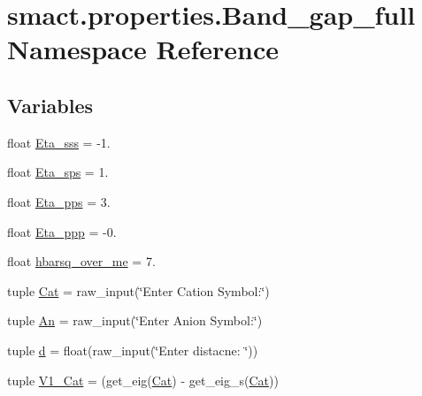 \hypertarget{namespacesmact_1_1properties_1_1_band__gap__full}{}\section{smact.\+properties.\+Band\+\_\+gap\+\_\+full Namespace Reference}
\label{namespacesmact_1_1properties_1_1_band__gap__full}
\subsection*{Variables}
\begin{DoxyCompactItemize}
\item 
float \hyperlink{namespacesmact_1_1properties_1_1_band__gap__full_a33c6d472118643d5753097ba13eb8c63}{Eta\+\_\+sss} = -\/1.
\item 
float \hyperlink{namespacesmact_1_1properties_1_1_band__gap__full_afec9c51df8f8ae4228ad90d10097981b}{Eta\+\_\+sps} = 1.
\item 
float \hyperlink{namespacesmact_1_1properties_1_1_band__gap__full_acd2104fa7868561e3f2e824c96dff9db}{Eta\+\_\+pps} = 3.
\item 
float \hyperlink{namespacesmact_1_1properties_1_1_band__gap__full_ad8248e3b75f41c62bc132eaf7fd7a332}{Eta\+\_\+ppp} = -\/0.
\item 
float \hyperlink{namespacesmact_1_1properties_1_1_band__gap__full_a4db80d70c7da3674fe2e949c069e41bb}{hbarsq\+\_\+over\+\_\+me} = 7.
\item 
tuple \hyperlink{namespacesmact_1_1properties_1_1_band__gap__full_a07754657208eba604cfe8ee09d738332}{Cat} = raw\+\_\+input(\char`\"{}Enter Cation Symbol\+:\char`\"{})
\item 
tuple \hyperlink{namespacesmact_1_1properties_1_1_band__gap__full_acc697d191f70ba02803a3906c6ec6844}{An} = raw\+\_\+input(\char`\"{}Enter Anion Symbol\+:\char`\"{})
\item 
tuple \hyperlink{namespacesmact_1_1properties_1_1_band__gap__full_a1f984013e926cf21ade71fba8291d5a8}{d} = float(raw\+\_\+input(\char`\"{}Enter distacne\+: \char`\"{}))
\item 
tuple \hyperlink{namespacesmact_1_1properties_1_1_band__gap__full_a2294208fd4a873e16824e061265bb3d5}{V1\+\_\+\+Cat} = (get\+\_\+eig(\hyperlink{namespacesmact_1_1properties_1_1_band__gap__full_a07754657208eba604cfe8ee09d738332}{Cat}) -\/ get\+\_\+eig\+\_\+s(\hyperlink{namespacesmact_1_1properties_1_1_band__gap__full_a07754657208eba604cfe8ee09d738332}{Cat}))

\end{DoxyCompactItemize}
